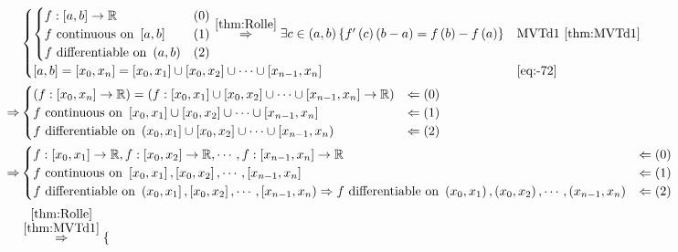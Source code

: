 \documentclass[
]{book}
\theoremstyle{definition}
\theoremstyle{definition}
\theoremstyle{definition}
\theoremstyle{definition}
\theoremstyle{remark}
\begin{document}
\[
\begin{aligned}
 & \begin{cases}
\begin{cases}
f:\left[a,b\right]\rightarrow\mathbb{R} & \left(0\right)\\
f\text{ continuous on }\left[a,b\right] & \left(1\right)\\
f\text{ differentiable on }\left(a,b\right) & \left(2\right)
\end{cases}\overset{\ref{thm:Rolle}}{\Rightarrow}\exists c\in\left(a,b\right)\left\{ f^{\prime}\left(c\right)\left(b-a\right)=f\left(b\right)-f\left(a\right)\right\}  & \text{MVTd1 }\ref{thm:MVTd1}\\
\left[a,b\right]=\left[x_{0},x_{n}\right]=\left[x_{0},x_{1}\right]\cup\left[x_{0},x_{2}\right]\cup\cdots\cup\left[x_{n-1},x_{n}\right] & \ref{eq:-72}
\end{cases}\\
\Rightarrow & \begin{cases}
\left(f:\left[x_{0},x_{n}\right]\rightarrow\mathbb{R}\right)=\left(f:\left[x_{0},x_{1}\right]\cup\left[x_{0},x_{2}\right]\cup\cdots\cup\left[x_{n-1},x_{n}\right]\rightarrow\mathbb{R}\right) & \Leftarrow\left(0\right)\\
f\text{ continuous on }\left[x_{0},x_{1}\right]\cup\left[x_{0},x_{2}\right]\cup\cdots\cup\left[x_{n-1},x_{n}\right] & \Leftarrow\left(1\right)\\
f\text{ differentiable on }\left(x_{0},x_{1}\right]\cup\left[x_{0},x_{2}\right]\cup\cdots\cup\left[x_{n-1},x_{n}\right) & \Leftarrow\left(2\right)
\end{cases}\\
\Rightarrow & \begin{cases}
f:\left[x_{0},x_{1}\right]\rightarrow\mathbb{R},f:\left[x_{0},x_{2}\right]\rightarrow\mathbb{R},\cdots,f:\left[x_{n-1},x_{n}\right]\rightarrow\mathbb{R} & \Leftarrow\left(0\right)\\
f\text{ continuous on }\left[x_{0},x_{1}\right],\left[x_{0},x_{2}\right],\cdots,\left[x_{n-1},x_{n}\right] & \Leftarrow\left(1\right)\\
f\text{ differentiable on }\left(x_{0},x_{1}\right],\left[x_{0},x_{2}\right],\cdots,\left[x_{n-1},x_{n}\right)\Rightarrow f\text{ differentiable on }\left(x_{0},x_{1}\right),\left(x_{0},x_{2}\right),\cdots,\left(x_{n-1},x_{n}\right) & \Leftarrow\left(2\right)
\end{cases}\\
 & \overset{\stackrel{\ref{thm:Rolle}}{\ref{thm:MVTd1}}}{\Rightarrow}\begin{cases}

\end{cases}
\end{aligned}\]
\end{document}
